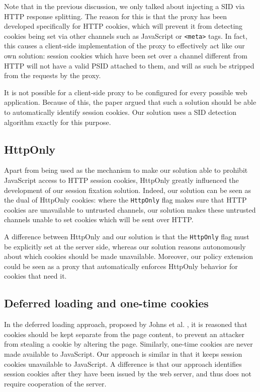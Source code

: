 Note that in the previous discussion, we only talked about injecting a SID via HTTP response splitting. The reason for this is that the proxy has been developed specifically for HTTP cookies, which will prevent it from detecting cookies being set via other channels such as JavaScript or \texttt{<meta>} tags. In fact, this causes a client-side implementation of the proxy to effectively act like our own solution: session cookies which have been set over a channel different from HTTP will not have a valid PSID attached to them, and will as such be stripped from the requests by the proxy.

It is not possible for a client-side proxy to be configured for every possible web application. Because of this, the paper argued that such a solution should be able to automatically identify session cookies. Our solution uses a SID detection algorithm exactly for this purpose.

\subsection{HttpOnly}\label{httponlyremark}

Apart from being used as the mechanism to make our solution able to prohibit JavaScript access to HTTP session cookies, HttpOnly greatly influenced the development of our session fixation solution. Indeed, our solution can be seen as the dual of HttpOnly cookies: where the \texttt{HttpOnly} flag makes sure that HTTP cookies are unavailable to untrusted channels, our solution makes these untrusted channels unable to set cookies which will be sent over HTTP.

A difference between HttpOnly and our solution is that the \texttt{HttpOnly} flag must be explicitly set at the server side, whereas our solution reasons autonomously about which cookies should be made unavailable.  Moreover, our policy extension could be seen as a proxy that automatically enforces HttpOnly behavior for cookies that need it.

\subsection{Deferred loading and one-time cookies}

In the deferred loading approach, proposed by Johns et al. \cite{Johns2006}, it is reasoned that cookies should be kept separate from the page content, to prevent an attacker from stealing a cookie by altering the page. Similarly, one-time cookies \cite{Dacosta2011} are never made available to JavaScript. Our approach is similar in that it keeps session cookies unavailable to JavaScript. A difference is that our approach identifies session cookies after they have been issued by the web server, and thus does not require cooperation of the server.


